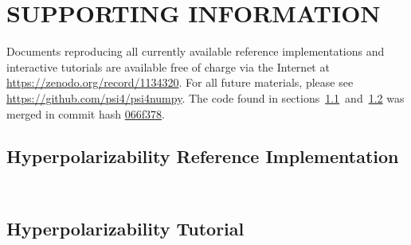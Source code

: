 \documentclass[%
  class = book,%
  crop = false,%
  float = true,%
  multi = true,%
  preview = false,%
]{standalone}
\newcommand{\caps}[1]{\uppercase{#1}}
\begin{document}
\section{\texorpdfstring{\caps{Supporting Information}}{Supporting Information}}

Documents reproducing all currently available reference implementations and interactive tutorials are available free of charge via the Internet at \url{https://zenodo.org/record/1134320}. For all future materials, please see \url{https://github.com/psi4/psi4numpy}. The code found in sections~\ref{paper_05:ssec:hyperpolarizability_reference_implementation}~and~\ref{paper_05:ssec:hyperpolarizability_tutorial} was merged in commit hash \href{https://github.com/psi4/psi4numpy/tree/066f378f26240a4802371ef32849230853581329}{066f378}.

\subsection{Hyperpolarizability Reference Implementation}
\label{paper_05:ssec:hyperpolarizability_reference_implementation}

\begin{singlespace}
\inputminted{python}{\IfStandalone{helper_CPHF.py}{paper_05/helper_CPHF.py}}
\inputminted{python}{\IfStandalone{beta.py}{paper_05/beta.py}}
\end{singlespace}

\subsection{Hyperpolarizability Tutorial}
\label{paper_05:ssec:hyperpolarizability_tutorial}

\providecommand{\tightlist}{%
  \setlength{\itemsep}{0pt}\setlength{\parskip}{0pt}}
\IfStandalone{}{}
\onlyifstandalone{\printbibliography}
\end{document}
